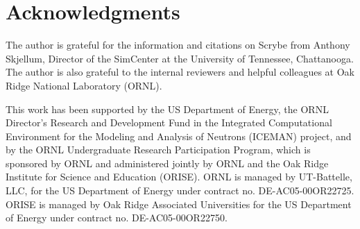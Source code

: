 \documentclass[sigconf]{acmart}
\begin{document}
\section*{Acknowledgments}\label{acknowledgments}

The author is grateful for the information and citations on Scrybe from Anthony Skjellum, Director of the SimCenter at the University of Tennessee, Chattanooga. The author is also grateful to the internal reviewers and helpful colleagues at Oak Ridge National Laboratory (ORNL).

This work has been supported by the US Department of Energy, the ORNL Director's Research and Development Fund in the Integrated Computational Environment for the Modeling and Analysis of Neutrons (ICEMAN) project, and by the ORNL Undergraduate Research Participation Program, which is sponsored by ORNL and administered jointly by ORNL and the Oak Ridge Institute for Science and
Education (ORISE). ORNL is managed by UT-Battelle, LLC, for the US Department of Energy under contract no. DE-AC05-00OR22725. ORISE is managed by Oak Ridge Associated Universities for the US Department of Energy under contract no. DE-AC05-00OR22750.



\end{document}
